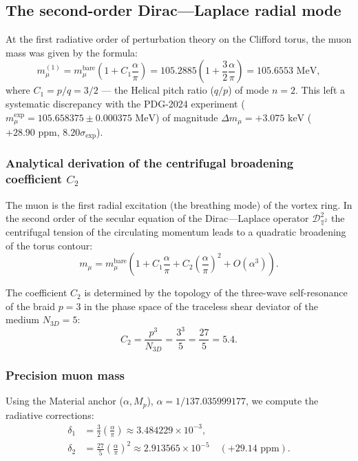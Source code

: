 \documentclass[11pt,a4paper]{article}
\theoremstyle{definition}
\theoremstyle{remark}
\begin{document}
\subsection{The second-order Dirac---Laplace radial mode}
\label{subsec:muon_order2_resolution}

At the first radiative order of perturbation theory on the Clifford torus, the muon mass was given by the formula:
\begin{equation}
m_\mu^{(1)} = m_\mu^{\mathrm{bare}} \left(1 + C_1 \frac{\alpha}{\pi}\right) = 105.2885 \left(1 + \frac{3}{2} \frac{\alpha}{\pi}\right) = 105.6553 \text{ MeV},
\end{equation}
where $C_1 = p/q = 3/2$ --- the Helical pitch ratio ($q/p$) of mode $n=2$. This left a systematic discrepancy with the PDG-2024 experiment ($m_\mu^{\mathrm{exp}} = 105.658375 \pm 0.000375\text{ MeV}$) of magnitude $\Delta m_\mu = +3.075\text{ keV}$ ($+28.90\text{ ppm}$, $8.20\sigma_{\mathrm{exp}}$).

\subsubsection{Analytical derivation of the centrifugal broadening coefficient $C_2$}

The muon is the first radial excitation (the breathing mode) of the vortex ring. In the second order of the secular equation of the Dirac---Laplace operator $\mathcal{D}_{\mathbb{T}^2}^2$ the centrifugal tension of the circulating momentum leads to a quadratic broadening of the torus contour:
\begin{equation}
m_\mu = m_\mu^{\mathrm{bare}} \left(1 + C_1 \frac{\alpha}{\pi} + C_2 \left(\frac{\alpha}{\pi}\right)^2 + O(\alpha^3)\right).
\end{equation}

The coefficient $C_2$ is determined by the topology of the three-wave self-resonance of the braid $p=3$ in the phase space of the traceless shear deviator of the medium $N_{3D} = 5$:
\begin{equation}
C_2 = \frac{p^3}{N_{3D}} = \frac{3^3}{5} = \frac{27}{5} = 5.4.
\end{equation}

\subsubsection{Precision muon mass}

Using the Material anchor ($\alpha, M_p$), $\alpha = 1/137.035999177$, we compute the radiative corrections:
\begin{align}
\delta_1 &= \frac{3}{2} \left(\frac{\alpha}{\pi}\right) \approx 3.484229 \times 10^{-3}, \\
\delta_2 &= \frac{27}{5} \left(\frac{\alpha}{\pi}\right)^2 \approx 2.913565 \times 10^{-5} \quad (+29.14\text{ ppm}).
\end{align}
\end{document}
